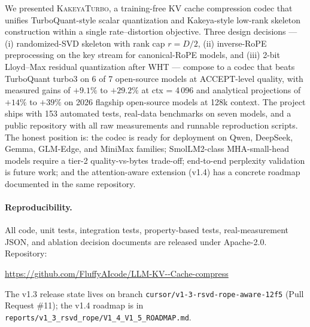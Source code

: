 \documentclass[11pt,a4paper]{article}
\theoremstyle{definition}
\theoremstyle{plain}
\begin{document}
We presented \textsc{KakeyaTurbo}, a training-free KV cache compression codec that unifies TurboQuant-style scalar quantization and Kakeya-style low-rank skeleton construction within a single rate--distortion objective. Three design decisions --- (i) randomized-SVD skeleton with rank cap $r = D/2$, (ii) inverse-RoPE preprocessing on the key stream for canonical-RoPE models, and (iii) 2-bit Lloyd--Max residual quantization after WHT --- compose to a codec that beats TurboQuant turbo3 on 6 of 7 open-source models at ACCEPT-level quality, with measured gains of $+9.1\%$ to $+29.2\%$ at ctx = 4\,096 and analytical projections of $+14\%$ to $+39\%$ on 2026 flagship open-source models at 128k context. The project ships with 153 automated tests, real-data benchmarks on seven models, and a public repository with all raw measurements and runnable reproduction scripts. The honest position is: the codec is ready for deployment on Qwen, DeepSeek, Gemma, GLM-Edge, and MiniMax families; SmolLM2-class MHA-small-head models require a tier-2 quality-vs-bytes trade-off; end-to-end perplexity validation is future work; and the attention-aware extension (v1.4) has a concrete roadmap documented in the same repository.

\paragraph{Reproducibility.} All code, unit tests, integration tests, property-based tests, real-measurement JSON, and ablation decision documents are released under Apache-2.0. Repository:
\begin{center}
\url{https://github.com/FluffyAIcode/LLM-KV--Cache-compress}
\end{center}
The v1.3 release state lives on branch \texttt{cursor/v1-3-rsvd-rope-aware-12f5} (Pull Request \#11); the v1.4 roadmap is in \texttt{reports/v1\_3\_rsvd\_rope/V1\_4\_V1\_5\_ROADMAP.md}.
\end{document}
